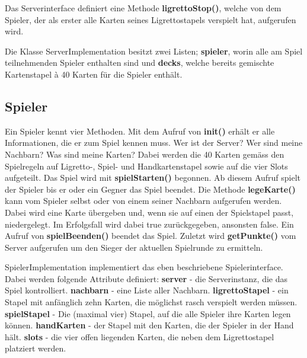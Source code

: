 Das Serverinterface definiert eine Methode {\bf ligrettoStop()}, welche von dem Spieler, der als erster alle Karten seines Ligrettostapels verspielt hat, aufgerufen wird.



Die Klasse ServerImplementation besitzt zwei Listen; {\bf spieler}, worin alle am Spiel teilnehmenden Spieler enthalten sind und {\bf decks}, welche bereits gemischte Kartenstapel à 40 Karten für die Spieler enthält.




\subsection{Spieler}

Ein Spieler kennt vier Methoden. Mit dem Aufruf von {\bf init()} erhält er alle Informationen, die er zum Spiel kennen muss. Wer ist der Server? Wer sind meine Nachbarn? Was sind meine Karten? Dabei werden die 40 Karten gemäss den Spielregeln auf Ligretto-, Spiel- und Handkartenstapel sowie auf die vier Slots aufgeteilt. Das Spiel wird mit {\bf spielStarten()} begonnen. Ab diesem Aufruf spielt der Spieler bis er oder ein Gegner das Spiel beendet. Die Methode {\bf legeKarte()} kann vom Spieler selbst oder von einem seiner Nachbarn aufgerufen werden. Dabei wird eine Karte übergeben und, wenn sie auf einen der Spielstapel passt, niedergelegt. Im Erfolgsfall wird dabei true zurückgegeben, ansonsten false. Ein Aufruf von {\bf spielBeenden()} beendet das Spiel. Zuletzt wird {\bf getPunkte()} vom Server aufgerufen um den Sieger der aktuellen Spielrunde zu ermitteln.



SpielerImplementation implementiert das eben beschriebene Spielerinterface. Dabei werden folgende Attribute definiert: {\bf server} - die Serverinstanz, die das Spiel kontrolliert. {\bf nachbarn} - eine Liste aller Nachbarn. {\bf ligrettoStapel} - ein Stapel mit anfänglich zehn Karten, die möglichst rasch verspielt werden müssen. {\bf spielStapel} - Die (maximal vier) Stapel, auf die alle Spieler ihre Karten legen können. {\bf handKarten} - der Stapel mit den Karten, die der Spieler in der Hand hält. {\bf slots} - die vier offen liegenden Karten, die neben dem Ligrettostapel platziert werden.





